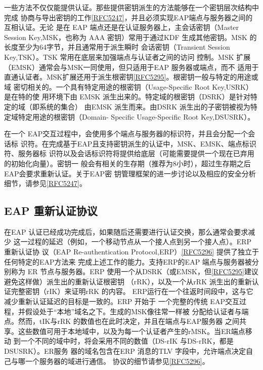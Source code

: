 一些方法不仅仅能提供认证。那些提供密钥派生的方法能够在一个密钥层次结构中完成
协商与导出密钥的工作\href{https://www.rfc-editor.org/rfc/rfc5247}{[RFC5247]}，并且必须实现EAP端点与服务器之间的互相认证。无论
是在 EAP 端点还是在认证服务器上，主会话密钥（Master Session Key,MSK，也称为 AAA
密钥）常用于通过KDF 生成其他密钥。MSK 的长度至少为64字节，并且通常用于派生瞬时
会话密钥（Transient Session Key,TSK）。TSK 常用在底层来加强端点与认证者之间的访问
控制。MSK 扩展（EMSK）通常会与MSK一同使用，但只适用于EAP 服务器或端点，而不
适用于直通认证者。MSK扩展还用于派生根密钥\href{https://www.rfc-editor.org/rfc/rfc5295}{[RFC5295]}。根密钥一般与特定的用途或域
密切相关的。一个具有特定用途的根密钥（Usage-Specific Root Key,USRK）是在特的使
用环境下由 EMSK 派生出来的。特定域的根密钥（DSRK）是针对特定的域（即系统的集合）
由EMSK 派生而来。由DSRK 派生出的子密钥被视为特定域特定用途的根密钥（Domain-
Specific Usage-Specific Root Key,DSUSRK）。

在一个 EAP交互过程中，会使用多个端点与服务器的标识符，并且会分配一个会话标
识符。在完成基于EAP且支持密钥派生的认证中，MSK、EMSK、端点标识符、服务器标
识符以及会话标识符将提供给底层（可能需要提供一个现在已弃用的初始化向量）。密钥一
般会有相关的生存期（推荐为8小时），超过生存期之后EAP会要求重新认证。关于EAP密
钥管理框架的进一步讨论以及相应的安全分析细节，请参见\href{https://www.rfc-editor.org/rfc/rfc5247}{[RFC5247]}。

\subsection{EAP 重新认证协议}
在EAP 认证已经成功完成后，如果随后还需要进行认证交换，那么通常会要求减少
这一过程的延迟（例如，一个移动节点从一个接人点到另一个接人点）。ERP 重新认证协
议（EAP Re-authentication Protocol,ERP）\href{https://www.rfc-editor.org/rfc/rfc5296}{[RFC5296]} 提供了独立于任何特定的EAP方法来
完成上述工作的能力。支持ERP的EAP 端点与服务器被分别称为 ER 节点与服务器。ERP
使用一个从DSRK（或EMSK，但\href{https://www.rfc-editor.org/rfc/rfc5295}{[RFC5295]}建议避免这样做）派生出的重新认证根密钥
（rRK），以及一个从rRK 派生出的重新认证完整密钥（rIK）来证明rRK 的内容。
ERP运行在一个往返时间段中，这与它减少重新认证延迟的目标是一致的。ERP 开始于
一个完整的传统 EAP交互过程，并假设处于“本地”域名之下。生成的MSK像往常一样被
分配给认证者与端点。然而，tIK与rRK 的数值也在此时决定，并且在端点与EAP服务器
之间共享。这些数值可用于本地域中，以及为每一个认证者产生的rMSK。当ER端点移动
到一个不同的域中时，将会采用不同的数值（DS-rIK 与DS-rRK，都是DSUSRK）。ER服务
器的域名包含在ERP 消息的TLV 字段中，允许端点决定自己与哪一个服务器的域进行通信。
协议的细节请参见\href{https://www.rfc-editor.org/rfc/rfc5296}{[RFC5296]}。

